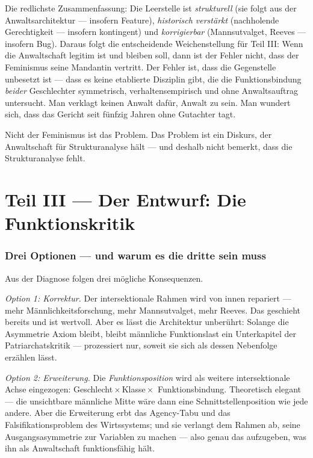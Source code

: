 Die redlichste Zusammenfassung: Die Leerstelle ist \emph{strukturell} (sie
folgt aus der Anwaltsarchitektur --- insofern Feature), \emph{historisch
verstärkt} (nachholende Gerechtigkeit --- insofern kontingent) und
\emph{korrigierbar} (Mannsutvalget, Reeves --- insofern Bug). Daraus folgt die
entscheidende Weichenstellung für Teil III: Wenn die Anwaltschaft legitim ist
und bleiben soll, dann ist der Fehler nicht, dass der Feminismus seine
Mandantin vertritt. Der Fehler ist, dass die Gegenstelle unbesetzt ist ---
dass es keine etablierte Disziplin gibt, die die Funktionsbindung
\emph{beider} Geschlechter symmetrisch, verhaltensempirisch und ohne
Anwaltsauftrag untersucht. Man verklagt keinen Anwalt dafür, Anwalt zu sein.
Man wundert sich, dass das Gericht seit fünfzig Jahren ohne Gutachter tagt.

\begin{merksatz}
Nicht der Feminismus ist das Problem. Das Problem ist ein Diskurs, der
Anwaltschaft für Strukturanalyse hält --- und deshalb nicht bemerkt, dass die
Strukturanalyse fehlt.
\end{merksatz}

\part*{Teil III --- Der Entwurf: Die Funktionskritik}

\section{Drei Optionen --- und warum es die dritte sein muss}

Aus der Diagnose folgen drei mögliche Konsequenzen.

\emph{Option 1: Korrektur.} Der intersektionale Rahmen wird von innen
repariert --- mehr Männlichkeitsforschung, mehr Mannsutvalget, mehr Reeves.
Das geschieht bereits und ist wertvoll. Aber es lässt die Architektur
unberührt: Solange die Asymmetrie Axiom bleibt, bleibt männliche
Funktionslast ein Unterkapitel der Patriarchatskritik --- prozessiert nur,
soweit sie sich als dessen Nebenfolge erzählen lässt.

\emph{Option 2: Erweiterung.} Die \emph{Funktionsposition} wird als weitere
intersektionale Achse eingezogen: Geschlecht\,$\times$\,Klasse\,$\times$\,%
Funktionsbindung. Theoretisch elegant --- die unsichtbare männliche Mitte wäre
dann eine Schnittstellenposition wie jede andere. Aber die Erweiterung erbt
das Agency-Tabu und das Falsifikationsproblem des Wirtssystems; und sie
verlangt dem Rahmen ab, seine Ausgangsasymmetrie zur Variablen zu machen ---
also genau das aufzugeben, was ihn als Anwaltschaft funktionsfähig hält.

